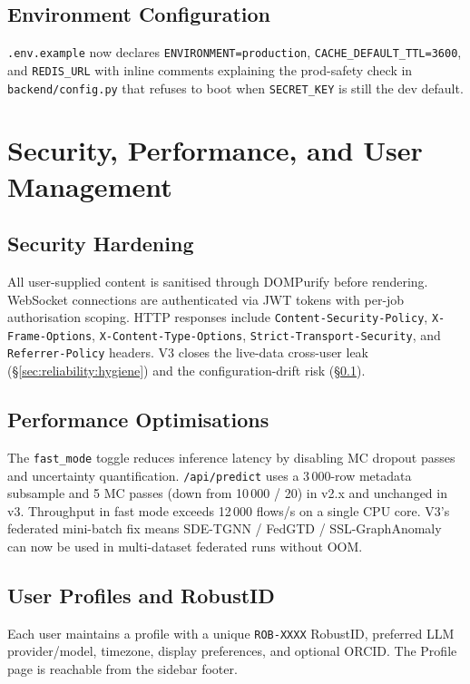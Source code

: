 \documentclass[11pt,a4paper]{article}
\begin{document}
\subsection{Environment Configuration}
\label{sec:reliability:env}

\texttt{.env.example} now declares \texttt{ENVIRONMENT=production},
\texttt{CACHE\_DEFAULT\_TTL=3600}, and \texttt{REDIS\_URL} with
inline comments explaining the prod-safety check in
\texttt{backend/config.py} that refuses to boot when
\texttt{SECRET\_KEY} is still the dev default.

\section{Security, Performance, and User Management}
\label{sec:security_performance}

\subsection{Security Hardening}
All user-supplied content is sanitised through DOMPurify before
rendering.  WebSocket connections are authenticated via JWT tokens
with per-job authorisation scoping.  HTTP responses include
\texttt{Content-Security-Policy}, \texttt{X-Frame-Options},
\texttt{X-Content-Type-Options}, \texttt{Strict-Transport-Security},
and \texttt{Referrer-Policy} headers.  V3 closes the live-data
cross-user leak (\S\ref{sec:reliability:hygiene}) and the
configuration-drift risk (\S\ref{sec:reliability:env}).

\subsection{Performance Optimisations}
The \texttt{fast\_mode} toggle reduces inference latency by disabling
MC dropout passes and uncertainty quantification.  \texttt{/api/predict}
uses a 3\,000-row metadata subsample and 5 MC passes (down from
10\,000 / 20) in v2.x and unchanged in v3.  Throughput in fast mode
exceeds 12\,000 flows/s on a single CPU core.  V3's federated
mini-batch fix means SDE-TGNN / FedGTD / SSL-GraphAnomaly can now be
used in multi-dataset federated runs without OOM.

\subsection{User Profiles and RobustID}
Each user maintains a profile with a unique \texttt{ROB-XXXX}
RobustID, preferred LLM provider/model, timezone, display
preferences, and optional ORCID.  The Profile page is reachable from
the sidebar footer.
\end{document}
